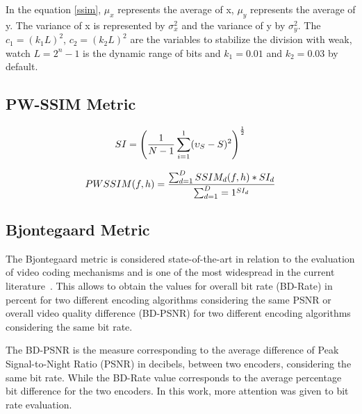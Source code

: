\documentclass{acm_proc_article-sp}
\begin{document}
In the equation \ref{ssim},  $\mu_{x}$ represents the average of x,  $\mu_{y}$ represents the average of y. The variance of x is represented by $\sigma _{x}^{2}$ and the variance of y by $\sigma _{y}^{2}$. The $c_{1}=(k_{1}L)^{2}$, $c_{2}=(k_{2}L)^{2}$ are the variables to stabilize the division with weak, watch $L = 2^{n} - 1$ is the dynamic range of bits and $k_{1}=0.01$ and $k_{2}=0.03$ by default.






\subsection{PW-SSIM Metric}


\begin{equation}
	\centering
	\label{si}
	SI = \left ( \frac{1}{N-1}\sum_{i=1}^{1}(\upsilon_{S}-S)^{2} \right )^{\frac{1}{2}}
\end{equation}


\begin{equation}
	\centering
	\label{pwssim}
	PWSSIM(f,h)= \frac{\sum_{d=1}^{D}SSIM_{d}(f,h)*SI_{d}}{\sum_{d=1}^{D}=1^{SI_{d}}}		
\end{equation}


\subsection{Bjontegaard Metric}

The Bjontegaard metric is considered state-of-the-art in relation to the evaluation of video coding mechanisms and is one of the most widespread in the current literature~\cite{Bjontegaard:01}\cite{Mathias}. This allows to obtain the values for overall bit rate (BD-Rate) in percent for two different encoding algorithms
considering the same PSNR or overall video quality difference (BD-PSNR) for two different encoding algorithms considering the same bit rate. %
	
The BD-PSNR is the measure corresponding to the average difference of Peak Signal-to-Night Ratio (PSNR) in decibels, between two encoders, considering the same bit rate. While the BD-Rate value corresponds to the average percentage bit difference for the two encoders. In this work, more attention was given to bit rate evaluation.	
\end{document}
